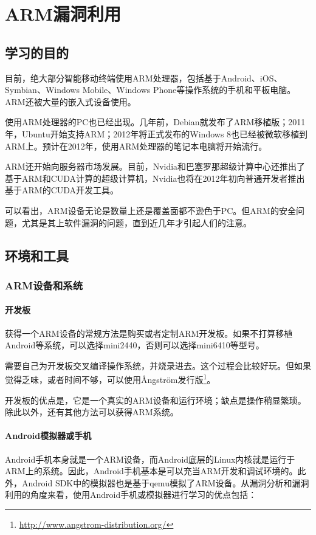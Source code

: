 \chapter{ARM漏洞利用}
\section{学习的目的}
目前，绝大部分智能移动终端使用ARM处理器，包括基于Android、iOS、Symbian、Windows Mobile、Windows Phone等操作系统的手机和平板电脑。ARM还被大量的嵌入式设备使用。

使用ARM处理器的PC也已经出现。几年前，Debian就发布了ARM移植版；2011年，Ubuntu开始支持ARM；2012年将正式发布的Windows 8也已经被微软移植到ARM上。预计在2012年，使用ARM处理器的笔记本电脑将开始流行。

ARM还开始向服务器市场发展。目前，Nvidia和巴塞罗那超级计算中心还推出了基于ARM和CUDA计算的超级计算机，Nvidia也将在2012年初向普通开发者推出基于ARM的CUDA开发工具。

可以看出，ARM设备无论是数量上还是覆盖面都不逊色于PC。但ARM的安全问题，尤其是其上软件漏洞的问题，直到近几年才引起人们的注意。
\section{环境和工具}
\subsection{ARM设备和系统}
\subsubsection{开发板}
获得一个ARM设备的常规方法是购买或者定制ARM开发板。如果不打算移植Android等系统，可以选择mini2440，否则可以选择mini6410等型号。

需要自己为开发板交叉编译操作系统，并烧录进去。这个过程会比较好玩。但如果觉得乏味，或者时间不够，可以使用Ångström发行版\footnote{\href{http://www.angstrom-distribution.org/}{http://www.angstrom-distribution.org/}}。

开发板的优点是，它是一个真实的ARM设备和运行环境；缺点是操作稍显繁琐。除此以外，还有其他方法可以获得ARM系统。

\subsubsection{Android模拟器或手机}
Android手机本身就是一个ARM设备，而Android底层的Linux内核就是运行于ARM上的系统。因此，Android手机基本是可以充当ARM开发和调试环境的。此外，Android SDK中的模拟器也是基于qemu模拟了ARM设备。从漏洞分析和漏洞利用的角度来看，使用Android手机或模拟器进行学习的优点包括：

